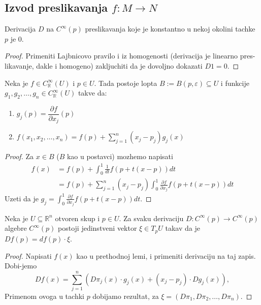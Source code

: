 \documentclass[a4paper,12pt]{article}
\newcommand{\RR}{\mathbb{R}}
\newcommand{\eps}{\varepsilon}
\newcommand{\psj}{\subseteq}
\newcommand{\ds}{\displaystyle}
\begin{document}
\subsection{Izvod preslikavanja $f:M \to N$}

\begin{lema}
	Derivacija $D$ na $C^\infty(p)$ preslikavanja koje je konstantno u nekoj okolini tachke $p$ je 0.
\end{lema}
\begin{proof}
	Primeniti Lajbnicovo pravilo i iz homogenosti (derivacija je linearno pres-likavanje, dakle i homogeno) zakljuchiti
	da je dovoljno dokazati $D1 = 0$.
\end{proof}

\begin{lema}
	Neka je $f \in C^\infty_\RR (U)$ i $p \in U$. Tada postoje lopta $B := B(p, \eps) \psj U$ i funkcije
	$g_1, g_2, \dotso, g_n \in C^\infty_\RR (U)$ takve da:
	\begin{enumerate}
		\item $g_j(p) = \dfrac{\partial f}{\partial x_j}(p)$
		\item $\ds{f(x_1, x_2, \dotso, x_n) = f(p) + \sum_{j=1}^n(x_j - p_j)g_j(x)}$
	\end{enumerate}
\end{lema}
\begin{proof}
	Za $x \in B$ ($B$ kao u postavci) mozhemo napisati
	\begin{align*}
		f(x) &= f(p) + \int_0^1 \frac{1}{dt}f(p+t(x-p))dt\\
			 &= f(p) + \sum_{j=1}^n(x_j - p_j)\int_0^1 \frac{\partial f}{\partial x_j}f(p+t(x-p))dt
	\end{align*}
	Uzeti da je \(\ds{ g_j = \int_0^1 \frac{\partial f}{\partial x_j}f(p+t(x-p))dt }\).
\end{proof}

\begin{tma}
	Neka je $U\psj \RR^n$ otvoren skup i $p\in U$. Za svaku derivaciju $D : C^\infty(p)\to C^\infty(p)$
	algebre $C^\infty(p)$ postoji jedinstveni vektor $\xi \in T_p U$ takav da je $Df(p) = df(p)\cdot \xi$.
\end{tma}
\begin{proof}
	Napisati $f(x)$ kao u prethodnoj lemi, i primeniti derivaciju na taj zapis. Dobi-jemo
	\[ Df(x) = \sum_{j=1}^n(D\pi_j(x)\cdot g_j(x) + (x_j - p_j)\cdot Dg_j(x)) ,\] 
	Primenom ovoga u tachki $p$ dobijamo rezultat, za $\xi = (D\pi_1, D\pi_2, \dotso, D\pi_n)$.
\end{proof}
\end{document}
